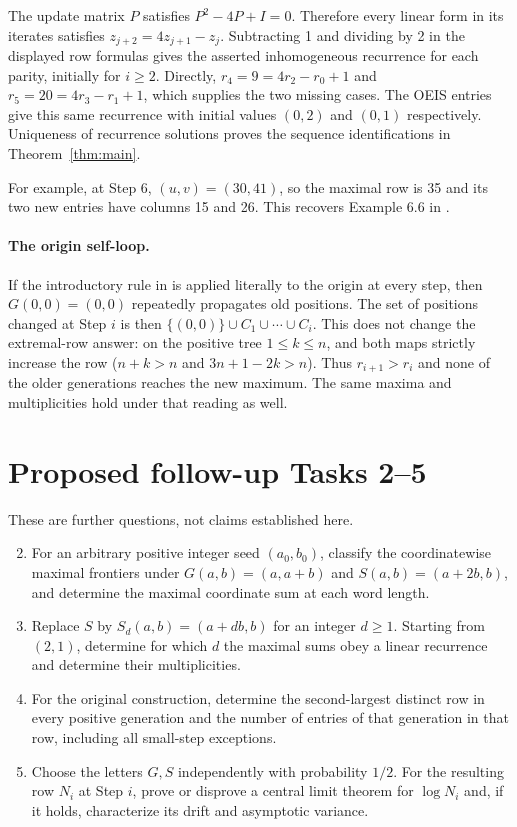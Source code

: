 \documentclass[11pt]{article}
\begin{document}
The update matrix $P$ satisfies $P^2-4P+I=0$. Therefore every
linear form in its iterates satisfies $z_{j+2}=4z_{j+1}-z_j$.
Subtracting 1 and dividing by 2 in the displayed row formulas gives
the asserted inhomogeneous recurrence for each parity, initially
for $i\geq2$. Directly, $r_4=9=4r_2-r_0+1$ and
$r_5=20=4r_3-r_1+1$, which supplies the two missing cases.
The OEIS entries \cite{even,odd} give this same recurrence with
initial values $(0,2)$ and $(0,1)$ respectively. Uniqueness of
recurrence solutions proves the sequence identifications in
Theorem~\ref{thm:main}.

For example, at Step 6, $(u,v)=(30,41)$, so the maximal row is 35
and its two new entries have columns 15 and 26. This recovers
Example 6.6 in \cite{C}.

\paragraph{The origin self-loop.}
If the introductory rule in \cite{C} is applied literally to the
origin at every step, then $G(0,0)=(0,0)$ repeatedly propagates old
positions. The set of positions changed at Step $i$ is then
$\{(0,0)\}\cup C_1\cup\cdots\cup C_i$.
This does not change the extremal-row answer: on the positive tree
$1\leq k\leq n$, and both maps strictly increase the row
($n+k>n$ and $3n+1-2k>n$). Thus $r_{i+1}>r_i$ and none of
the older generations reaches the new maximum. The same maxima
and multiplicities hold under that reading as well.

\section*{Proposed follow-up Tasks 2--5}
These are further questions, not claims established here.
\begin{enumerate}
\setcounter{enumi}{1}
\item For an arbitrary positive integer seed $(a_0,b_0)$, classify
the coordinatewise maximal frontiers under $G(a,b)=(a,a+b)$ and
$S(a,b)=(a+2b,b)$, and determine the maximal coordinate sum at
each word length.
\item Replace $S$ by $S_d(a,b)=(a+db,b)$ for an integer $d\geq1$.
Starting from $(2,1)$, determine for which $d$ the maximal sums
obey a linear recurrence and determine their multiplicities.
\item For the original construction, determine the second-largest
distinct row in every positive generation and the number of entries
of that generation in that row, including all small-step exceptions.
\item Choose the letters $G,S$ independently with probability $1/2$.
For the resulting row $N_i$ at Step $i$, prove or disprove a central
limit theorem for $\log N_i$ and, if it holds, characterize its drift
and asymptotic variance.
\end{enumerate}
\end{document}
